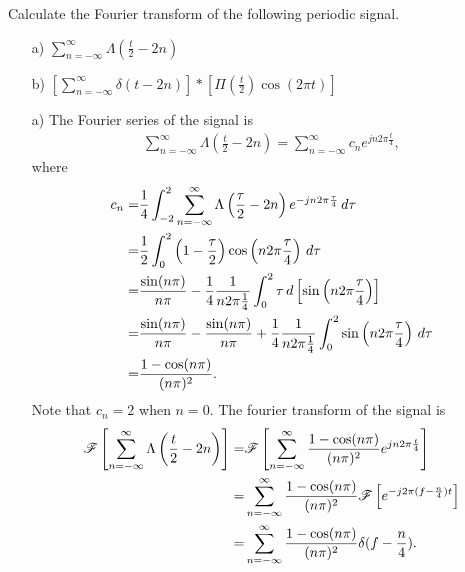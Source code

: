 \documentclass{assignment}
\begin{document}
\begin{prob}[20 pts]
    Calculate the Fourier transform of the following periodic signal.
    \begin{itemize}
        \item[a)] $\sum_{n=-\infty}^{\infty}\Lambda(\frac{t}{2}-2n)$
        \item[b)] $\left[\sum_{n=-\infty}^{\infty}\delta(t-2n)\right]*\left[\Pi(\frac{t}{2})\cos(2\pi t)\right]$
    \end{itemize}
\end{prob}
\begin{sol}
    \begin{itemize}
        \item[a)] The Fourier series of the signal is
        \begin{align}
            \sum_{n=-\infty}^{\infty}\Lambda\left(\frac{t}{2}-2n\right)=\sum_{n=-\infty}^{\infty}c_ne^{jn2\pi\frac{t}{4}},
        \end{align}
        where
        \begin{align}
            \notag c_n=&\frac{1}{4}\int_{-2}^2\sum_{n=-\infty}^{\infty}\Lambda\left(\frac{\tau}{2}-2n\right)e^{-jn2\pi\frac{\tau}{4}}\,d\tau\\
            \notag=&\frac{1}{2}\int_0^2\left(1-\frac{\tau}{2}\right)\cos\left(n2\pi \frac{\tau}{4}\right)\,d\tau\\
            \notag=&\frac{\sin(n\pi)}{n\pi}-\frac{1}{4}\frac{1}{n2\pi\frac{1}{4}}\int_0^2\tau\,d\left[\sin\left(n2\pi\frac{\tau}{4}\right)\right]\\
            \notag=&\frac{\sin(n\pi)}{n\pi}-\frac{\sin(n\pi)}{n\pi}+\frac{1}{4}\frac{1}{n2\pi\frac{1}{4}}\int_0^2\sin\left(n2\pi\frac{\tau}{4}\right)\,d\tau\\
            =&\frac{1-\cos(n\pi)}{(n\pi)^2}.
        \end{align}
        Note that $c_n=2$ when $n=0$.
        The fourier transform of the signal is
        \begin{align}
            \notag\mathscr{F}\left[\sum_{n=-\infty}^{\infty}\Lambda\left(\frac{t}{2}-2n\right)\right]=&\mathscr{F}\left[\sum_{n=-\infty}^{\infty}\frac{1-\cos(n\pi)}{(n\pi)^2}e^{jn2\pi\frac{t}{4}}\right]\\
            \notag=&\sum_{n=-\infty}^{\infty}\frac{1-\cos(n\pi)}{(n\pi)^2}\mathscr{F}\left[e^{-j2\pi(f-\frac{n}{4})t}\right]\\
            =&\sum_{n=-\infty}^{\infty}\frac{1-\cos(n\pi)}{(n\pi)^2}\delta(f-\frac{n}{4}).
        \end{align}

\end{itemize}
\end{sol}
\end{document}
